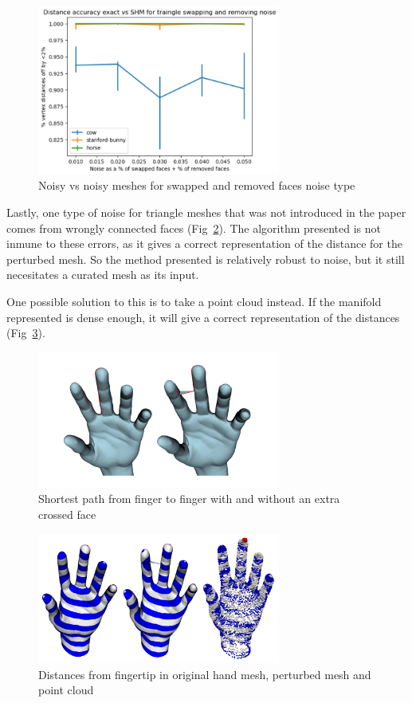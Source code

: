 \documentclass[sigconf]{acmart}
\begin{document}
\begin{figure}
  \centering
  \includegraphics[width=8cm]{original_vs_original_swapped_and_removed_triangles.png}
  \caption{Noisy vs noisy meshes for swapped and removed faces noise type}
  \label{fig:noisy_vs_noisy_swapped_and_removed}
\end{figure}

Lastly, one type of noise for triangle meshes that was not introduced in the paper comes from
wrongly connected faces (Fig~\ref{fig:hands}). The algorithm presented is not inmune to these errors,
as it gives a correct representation of the distance for the perturbed mesh. So the method
presented is relatively robust to noise, but it still necesitates a curated mesh as its input. 

One possible solution to this is to take a point cloud instead. If the manifold represented is
dense enough, it will give a correct representation of the distances (Fig~\ref{fig:hand_distances}).

\begin{figure}
  \centering
  \includegraphics[width=8cm]{hands.png}
  \caption{Shortest path from finger to finger with and without an extra crossed face}
  \label{fig:hands}
\end{figure}

\begin{figure}
  \centering
  \includegraphics[width=8cm]{hands_distances.png}
  \caption{Distances from fingertip in original hand mesh, perturbed mesh and point cloud}
  \label{fig:hand_distances}
\end{figure}
\end{document}
